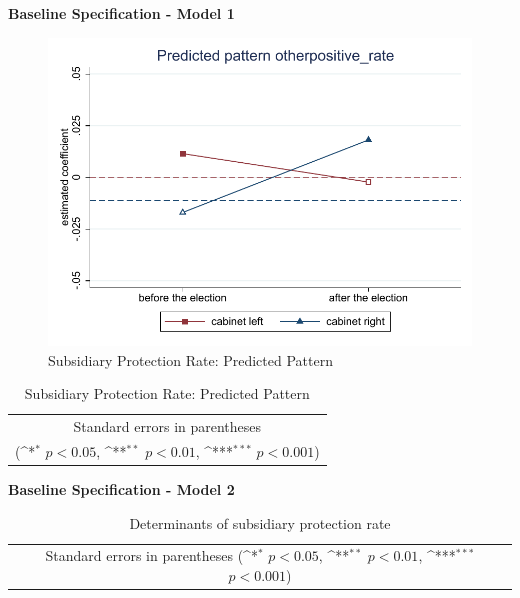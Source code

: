 \documentclass[10pt,a4paper]{scrartcl}
\begin{document}
\clearpage
\textbf{Baseline Specification - Model 1}
\begin{figure}[!ht]
	\centering
	\includegraphics[width=1\textwidth]{figures_edited/otherpositive_rate_graph1_baseline.pdf}
	\caption{Subsidiary Protection Rate: Predicted Pattern}
\end{figure}

\begin{table}[!ht]\centering
	\renewcommand{\arraystretch}{1.25}
	\def\sym#1{\ifmmode^{#1}\else\(^{#1}\)\fi}
	\caption{Subsidiary Protection Rate: Predicted Pattern}
	\begin{tabular}[]{l*{2}{c}}
		\hline\hline
		
		\hline\hline
		\multicolumn{3}{c}{\footnotesize Standard errors in parentheses} \\
		\multicolumn{3}{c}{\footnotesize (\sym{*} \(p<0.05\), \sym{**} \(p<0.01\), \sym{***} \(p<0.001\))}\\
	\end{tabular}
\end{table}

\clearpage
\textbf{Baseline Specification - Model 2}
\begin{table}[!ht]\centering
	\scriptsize
	\renewcommand{\arraystretch}{1.1}
	\def\sym#1{\ifmmode^{#1}\else\(^{#1}\)\fi}
	\caption{Determinants of subsidiary protection rate}
	\begin{tabular}{l*{3}{c}}
		\hline\hline
		
		\hline\hline
		\multicolumn{4}{c}{\footnotesize Standard errors in parentheses (\sym{*} \(p<0.05\), \sym{**} \(p<0.01\), \sym{***} \(p<0.001\))}\\
	\end{tabular}
\end{table}
\end{document}
